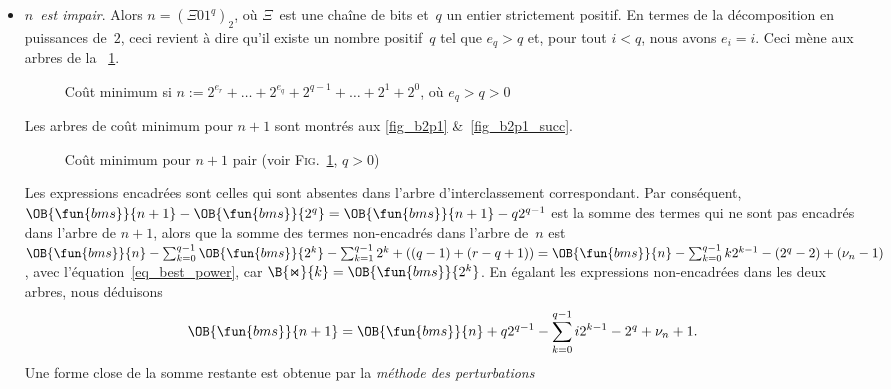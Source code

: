 \begin{itemize}
  \item \emph{\(n\)~est impair}. Alors \(n = (\Xi 01^q)_2\), où
  \(\Xi\)~est une chaîne de bits et~\(q\) un entier strictement
  positif. En termes de la décomposition en puissances de~\(2\), ceci
  revient à dire qu'il existe un nombre positif~\(q\) tel que
  \(e_q>q\) et, pour tout \(i < q\), nous avons \(e_i=i\). Ceci
  mène aux arbres de la \fig~\ref{fig_B2p1}.
\begin{figure}[t]
\centering
{}
\qquad
{}
\caption{Coût minimum si \(n:=2^{e_r} + \dots + 2^{e_q} + 2^{q-1} +
  \dots + 2^1 + 2^0\), où \(e_q > q > 0\)
\label{fig_B2p1}}
\end{figure}
Les arbres de coût minimum pour \(n+1\) sont montrés aux \figs{}
\ref{fig_b2p1} \&~\ref{fig_b2p1_succ}.
\begin{figure}
\centering
{}
\qquad
{}
\caption{Coût minimum pour \(n+1\) pair
(voir \textsc{Fig}.~\ref{fig_B2p1}, \(q>0\))}
\end{figure}
Les expressions encadrées sont celles qui sont absentes dans l'arbre
d'interclassement correspondant. Par conséquent, 
\(\OB{\fun{bms}}{n+1} -
\OB{\fun{bms}}{2^q} = \OB{\fun{bms}}{n+1} - q2^{q-1}\) est la somme
des termes qui ne sont pas encadrés dans l'arbre de \(n+1\), alors que
la somme des termes non-encadrés dans l'arbre de~\(n\) est
\(\OB{\fun{bms}}{n} - \sum_{k=0}^{q-1}\OB{\fun{bms}}{2^k} -
\sum_{k=1}^{q-1}2^k + ((q-1)+(r-q+1)) = \OB{\fun{bms}}{n} -
\sum_{k=0}^{q-1}{k2^{k-1}} - (2^q - 2) + (\nu_n - 1)\), avec
l'équation~\eqref{eq_best_power}, car \(\B{\Join}{k} =
\OB{\fun{bms}}{2^k}\). En égalant les expressions non-encadrées dans
les deux arbres, nous déduisons
\begin{equation}
\abovedisplayskip=4pt
\belowdisplayskip=4pt
\OB{\fun{bms}}{n+1} = \OB{\fun{bms}}{n} + q2^{q-1} -
\sum_{k=0}^{q-1}{i2^{k-1}} - 2^q + \nu_n + 1.
\label{eq_B1}
\end{equation}
Une forme close de la somme restante est obtenue par la \emph{méthode
  des perturbations}

\end{itemize}

